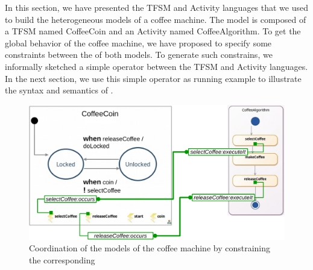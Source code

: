 In this section, we have presented the TFSM and Activity languages that we used to build the heterogeneous models of a coffee machine. The model is composed of a TFSM named CoffeeCoin and an Activity named CoffeeAlgorithm. To get the global behavior of the coffee machine, we have proposed to specify some constraints between the \mse of both models. To generate such constrains, we informally sketched a simple \bcool operator between the TFSM and Activity languages. In the next section, we use this simple operator as running example to illustrate the syntax and semantics of \bcool. 

  
	\begin{figure}[h]
		\begin{center}
			\includegraphics[width=1\textwidth]{bcool/figs/tfsmandadcoord}
			\caption{Coordination of the models of the coffee machine by constraining the corresponding \mse}
			\label{fig:tfsmandadcoord}
		\end{center}
	\end{figure}

